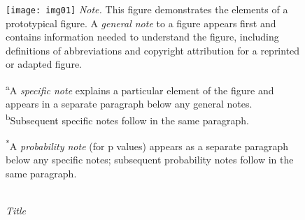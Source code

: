 \begin{figure}[t]
  \label{fig:a-cool-label-to-use-for-reference}
  \caption[]{ \\ \textit{Title}}
  
  \texttt{[image: img01]} %
  \break \textit{Note. }This figure demonstrates the elements of a
  prototypical figure. A \textit{general note} to a figure appears first
  and contains information needed to understand the figure, including
  definitions of abbreviations and copyright attribution for a reprinted
  or adapted figure.

  \textsuperscript{a}A \textit{specific note} explains a
  particular element of the figure and appears in a separate paragraph
  below any general notes. \textsuperscript{b}Subsequent specific
  notes follow in the same paragraph.

  \textsuperscript{*}A \textit{probability note} (for p values) appears
  as a separate paragraph below any specific notes; subsequent probability
  notes follow in the same paragraph.
\end{figure}